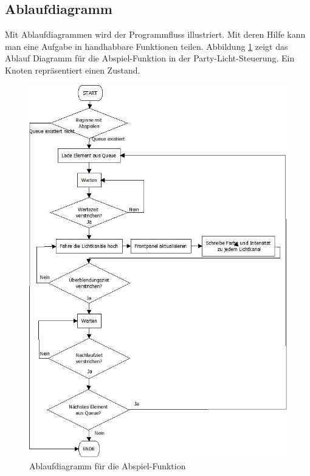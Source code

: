 \subsection{Ablaufdiagramm }
Mit Ablaufdiagrammen wird der Programmfluss illustriert. Mit deren Hilfe kann man eine Aufgabe in handhabbare Funktionen teilen. Abbildung \ref{fig:plan01} zeigt das Ablauf Diagramm für die Abspiel-Funktion in der Party-Licht-Steuerung. Ein Knoten repräsentiert einen Zustand.
	\begin{figure}[h!]
	\centering
		\includegraphics[height=0.9\textheight]{Pics/play-flowchart.jpeg}
	\caption{Ablaufdiagramm für die Abspiel-Funktion}
	\label{fig:plan01}
	\end{figure}	
		
